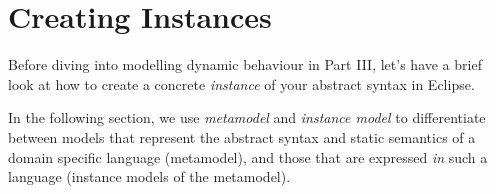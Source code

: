 \newpage
\genHeader

\section{Creating Instances}
\hypertarget{sec:creatingInstance common}{}

Before diving into modelling dynamic behaviour in Part III, let's have a brief look at how to create a concrete \emph{instance} of your abstract syntax in
Eclipse.

\vspace{0.5cm}

In the following section, we use \emph{metamodel} and \emph{instance model} to differentiate between models that represent the abstract syntax and static
semantics of a domain specific language (metamodel), and those that are expressed \emph{in} such a language (instance models of the metamodel).

